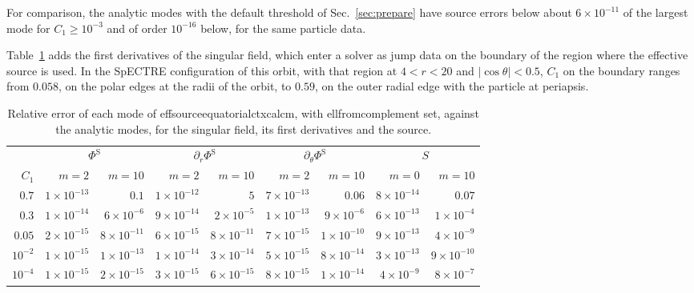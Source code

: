 \documentclass[11pt]{article}
\newcommand{\PhiS}{\Phi^{\mathrm{S}}}
\newcommand{\codeus}{\textunderscore\allowbreak}
\newcommand{\codehy}{-\allowbreak}
\newcommand{\code}[1]{{\ttfamily\let\_\codeus\let\-\codehy #1}}
\begin{document}
For comparison, the analytic modes with the default threshold of
Sec.~\ref{sec:prepare} have source errors below about $6\times10^{-11}$ of the
largest mode for $C_1\ge10^{-3}$ and of order $10^{-16}$ below, for the same
particle data.

Table~\ref{tab:old_fields} adds the first derivatives of the singular field,
which enter a solver as jump data on the boundary of the region where the
effective source is used. In the SpECTRE configuration of this orbit, with that
region at $4<r<20$ and $|\cos\theta|<0.5$, $C_1$ on the boundary ranges from
$0.058$, on the polar edges at the radii of the orbit, to $0.59$, on the outer
radial edge with the particle at periapsis.

\begin{table}[H]
  \centering
  \caption{Relative error of each mode of \code{effsource\_equatorial\_ctx\_calc\_m},
    with \code{ell\_from\_complement} set, against the analytic modes, for the
    singular field, its first derivatives and the source.}
  \label{tab:old_fields}
  \small
  \setlength{\tabcolsep}{4pt}
  \begin{tabular}{rrrrrrrrr}
    \toprule
    & \multicolumn{2}{c}{$\PhiS$} & \multicolumn{2}{c}{$\partial_r\PhiS$}
    & \multicolumn{2}{c}{$\partial_\theta\PhiS$} & \multicolumn{2}{c}{$S$} \\
    \cmidrule(lr){2-3}\cmidrule(lr){4-5}\cmidrule(lr){6-7}\cmidrule(lr){8-9}
    $C_1$ & $m=2$ & $m=10$ & $m=2$ & $m=10$ & $m=2$ & $m=10$ & $m=0$ & $m=10$ \\
    \midrule
    $0.7$     & $1\times10^{-13}$ & $0.1$               & $1\times10^{-12}$ & $5$                 & $7\times10^{-13}$ & $0.06$              & $8\times10^{-14}$ & $0.07$ \\
    $0.3$     & $1\times10^{-14}$ & $6\times10^{-6}$    & $9\times10^{-14}$ & $2\times10^{-5}$    & $1\times10^{-13}$ & $9\times10^{-6}$    & $6\times10^{-13}$ & $1\times10^{-4}$ \\
    $0.05$    & $2\times10^{-15}$ & $8\times10^{-11}$   & $6\times10^{-15}$ & $8\times10^{-11}$   & $7\times10^{-15}$ & $1\times10^{-10}$   & $9\times10^{-13}$ & $4\times10^{-9}$ \\
    $10^{-2}$ & $1\times10^{-15}$ & $1\times10^{-13}$   & $1\times10^{-14}$ & $3\times10^{-14}$   & $5\times10^{-15}$ & $8\times10^{-14}$   & $3\times10^{-13}$ & $9\times10^{-10}$ \\
    $10^{-4}$ & $1\times10^{-15}$ & $2\times10^{-15}$   & $3\times10^{-15}$ & $6\times10^{-15}$   & $8\times10^{-15}$ & $1\times10^{-14}$   & $4\times10^{-9}$  & $8\times10^{-7}$ \\
    \bottomrule
  \end{tabular}
\end{table}
\end{document}
